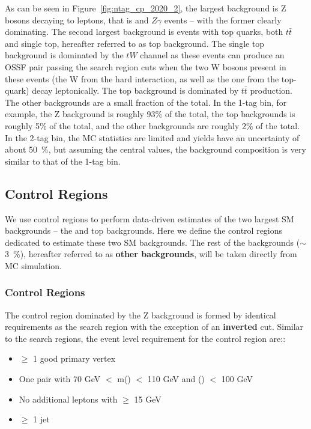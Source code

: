 As can be seen in Figure~\ref{fig:ntag_cp_2020_2}, the largest background is Z bosons decaying to leptons,
 that is \DY and $Z\gamma$ events -- with the former clearly dominating.
The second largest background is events with top quarks, both $t\bar{t}$ and
 single top, hereafter referred to as top background.
The single top background is dominated by the $tW$ channel as these events can
produce an OSSF pair passing the search region cuts when the two W bosons
present in these events (the W from the hard interaction, as well as the one
from the top-quark) decay leptonically. The top background is dominated by $t\bar{t}$ production.
The other backgrounds are a small fraction of the total.
In the 1-tag bin, for example, the Z background is roughly 93\% of the total,
the top backgrounds is roughly 5\% of the total, and the other backgrounds are roughly 2\% of the total.
In the 2-tag bin, the MC statistics are limited and yields have an uncertainty
of about 50~\%, but assuming the central values, the background composition is very similar to that of the 1-tag bin.

\subsection{Control Regions}\label{sec:controlregion}

We use control regions to perform data-driven estimates of the two largest SM
backgrounds -- the \Z and top backgrounds.
Here we define the control regions dedicated to estimate these two SM backgrounds.
The rest of the backgrounds ($\sim$3~\%), hereafter referred to as
\textbf{other backgrounds}, will be taken directly from MC simulation.

\subsubsection{\Z Control Regions}

The control region dominated by the Z background is formed
by identical requirements as the search region with the exception of an \textbf{inverted} \ptossf cut.
Similar to the search regions, the event level requirement for the control region are::
\begin{itemize}
  \item $\geq$ 1 good primary vertex
  \item One \dilepton pair with 70 GeV $<$ m(\dilepton) $<$ 110 GeV and \pt(\dilepton) $<$ 100 GeV
  \item No additional leptons with \pt $\geq$ 15 GeV
  \item $\geq$ 1 jet
\end{itemize}

